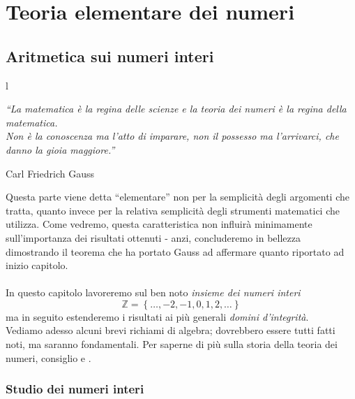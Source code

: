 \part{Teoria elementare dei numeri}




\chapter{Aritmetica sui numeri interi}l
\label{lezione1}
\epigraph{\textit{\enquote{La matematica è la regina delle scienze e la teoria dei numeri è la regina della matematica. \\ Non è la conoscenza ma l'atto di imparare, non il possesso ma l'arrivarci, che danno la gioia maggiore.}}}{Carl Friedrich Gauss}
Questa parte viene detta \enquote{elementare} non per la semplicità degli argomenti che tratta, quanto invece per la relativa semplicità degli strumenti matematici che utilizza. Come vedremo, questa caratteristica non influirà minimamente sull'importanza dei risultati ottenuti - anzi, concluderemo in bellezza dimostrando il teorema che ha portato Gauss ad affermare quanto riportato ad inizio capitolo. \\ \\
In questo capitolo lavoreremo sul ben noto \textit{insieme dei numeri interi}
\begin{equation*}
	\mathbb{Z}= \left\{\dots,-2,-1,0,1,2,\dots\right\}
\end{equation*}
ma in seguito estenderemo i risultati ai più generali \textit{domini d'integrità}. \\ 
Vediamo adesso alcuni brevi richiami di algebra; dovrebbero essere tutti fatti noti, ma saranno fondamentali. Per saperne di più sulla storia della teoria dei numeri, consiglio \cite{D19} e \cite{G97}.


\section{Studio dei numeri interi}
